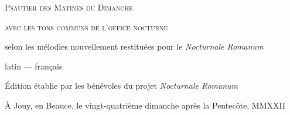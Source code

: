 \documentclass[psautier_nocturne_fr.tex]{subfiles}
\begin{document}
\null

\vfill
\begin{center}
{\Huge \textsc{Psautier des Matines du Dimanche}}\par
\vspace{3cm}
{\large \textsc{avec les tons communs de l'office nocturne}}\par
\vspace{5cm}
{\large selon les mélodies nouvellement restituées pour le \emph{Nocturnale Romanum}}\par
\vspace{3cm}
{\large latin --- français}\par
\end{center}
\vfill
\pagebreak
\thispagestyle{empty}
\null

\vfill
\begin{center}
{\footnotesize Édition établie par les bénévoles du projet \emph{Nocturnale Romanum}}

{\footnotesize À Jouy, en Beauce, le vingt-quatrième dimanche après la Pentecôte, MMXXII}
\end{center}
\end{document}
